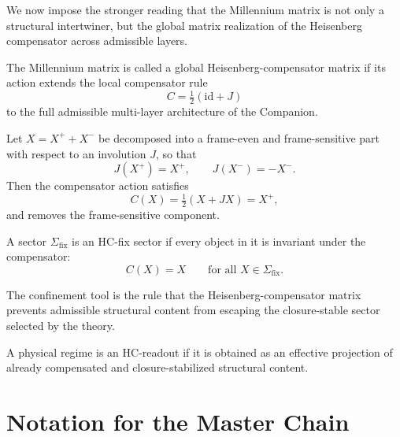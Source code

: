 \begin{remark}
We now impose the stronger reading that the Millennium matrix is not only a
structural intertwiner, but the global matrix realization of the Heisenberg
compensator across admissible layers.
\end{remark}

\begin{definition}
The Millennium matrix is called a global Heisenberg-compensator matrix if its
action extends the local compensator rule
\[
C=\tfrac12(\mathrm{id}+J)
\]
to the full admissible multi-layer architecture of the Companion.
\end{definition}

\begin{definition}
Let $X=X^+ + X^-$ be decomposed into a frame-even and frame-sensitive part
with respect to an involution $J$, so that
\[
J(X^+) = X^+,
\qquad
J(X^-) = -X^-.
\]
Then the compensator action satisfies
\[
C(X)=\tfrac12(X+JX)=X^+,
\]
and removes the frame-sensitive component.
\end{definition}

\begin{definition}
A sector $\Sigma_{\mathrm{fix}}$ is an HC-fix sector if every object in it is
invariant under the compensator:
\[
C(X)=X
\qquad\text{for all }X\in\Sigma_{\mathrm{fix}}.
\]
\end{definition}

\begin{definition}
The confinement tool is the rule that the Heisenberg-compensator matrix
prevents admissible structural content from escaping the closure-stable sector
selected by the theory.
\end{definition}

\begin{definition}
A physical regime is an HC-readout if it is obtained as an effective
projection of already compensated and closure-stabilized structural content.
\end{definition}

\section{Notation for the Master Chain}
\label{app:master-chain-notation}

